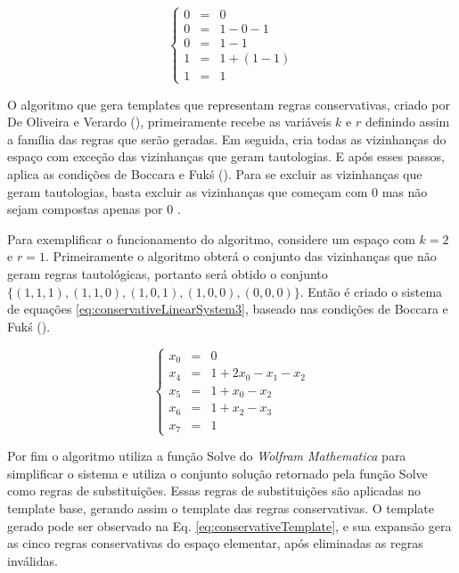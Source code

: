 \begin{equation}
\left\{\begin{matrix}
 0 & = & 0 \\ 
 0 & = & 1 - 0 - 1 \\ 
 0 & = & 1 - 1 \\ 
 1 & = & 1 + (1 - 1)\\ 
 1 & = & 1 
\end{matrix}\right.
\label{eq:conservativeAC204}
\end{equation}

O algoritmo que gera templates que representam regras conservativas, criado por De Oliveira e Verardo (\citeyear{deOliveira2014}), primeiramente recebe as variáveis $k$ e $r$ definindo assim a família das regras que serão geradas. Em seguida, cria todas as vizinhanças do espaço com exceção das vizinhanças que geram tautologias. E após esses passos, aplica as condições de Boccara e Fukś (\citeyear{boccara2002}). Para se excluir as vizinhanças que geram tautologias, basta excluir as vizinhanças que começam com 0 mas não sejam compostas apenas por 0 \cite{Schranko2010}.

Para exemplificar o funcionamento do algoritmo, considere um espaço com $k=2$ e $r=1$. Primeiramente o algoritmo obterá o conjunto das vizinhanças que não geram regras tautológicas, portanto será obtido o conjunto $\{(1,1,1),(1,1,0),(1,0,1),(1,0,0),(0,0,0)\}$. Então é criado o sistema de equações \eqref{eq:conservativeLinearSystem3}, baseado nas condições de Boccara e Fukś (\citeyear{boccara2002}).

\begin{equation}
\left\{\begin{matrix}
 x_0 & = & 0\\ 
 x_4 & = & 1 +2x_0 -x_1 -x_2\\ 
 x_5 & = & 1 +x_0 -x_2\\
 x_6 & = & 1 +x_2 -x_3\\ 
 x_7 & = & 1
\end{matrix}\right.
\label{eq:conservativeLinearSystem3}
\end{equation}

Por fim o algoritmo utiliza a função Solve do \textit{Wolfram Mathematica} para simplificar o sistema e utiliza o conjunto solução retornado pela função Solve como regras de substituições. Essas regras de substituições são aplicadas no template base, gerando assim o template das regras conservativas. O template gerado pode ser observado na Eq. \eqref{eq:conservativeTemplate}, e sua expansão gera as cinco regras conservativas do espaço elementar, após eliminadas as regras inválidas.


